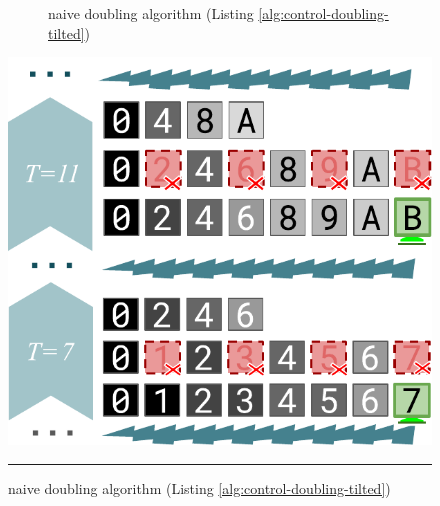 \begin{figure}
\begin{subfigure}{0.33\linewidth}
\centering
\caption{naive doubling algorithm (Listing \ref{alg:control-doubling-tilted})}
\label{fig:surface-control-tilted:naive-doubling}
\end{subfigure}
\begin{minipage}{0.63\linewidth}
\centering
\includegraphics[width=\linewidth]{img/surface-control-tilted-naive-doubling}
\end{minipage}

\vspace{1ex}

\noindent\rule{\linewidth}{1pt}

\vspace{1ex}


\end{figure}
